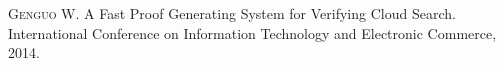 
\begin{publications}{99}

    \item\textsc{Genguo W}. {A Fast Proof Generating System for Verifying Cloud Search}.
      International Conference on Information Technology and Electronic Commerce, 2014.

\end{publications}
